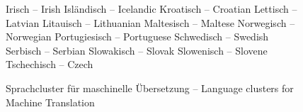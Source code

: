 \documentclass[]{../../metanetpaper}
\begin{document}
\begin{Parallel}[c]{79mm}{78mm}
\begin{figure}
\begin{tabular}
Irisch -- Irish \newline 
Isländisch -- Icelandic \newline 
Kroatisch -- Croatian \newline 
Lettisch -- Latvian \newline 
Litauisch -- Lithuanian \newline 
Maltesisch -- Maltese \newline 
Norwegisch -- Norwegian \newline 
Portugiesisch -- Portuguese \newline 
Schwedisch -- Swedish \newline 
Serbisch -- Serbian \newline 
Slowakisch -- Slovak \newline 
Slowenisch -- Slovene \newline 
Tschechisch -- Czech \\
\end{tabular}
\label{fig:mt_cluster}
\caption{Sprachcluster für maschinelle Übersetzung -- Language clusters for Machine Translation}
\end{figure}


\end{Parallel}
\end{document}
